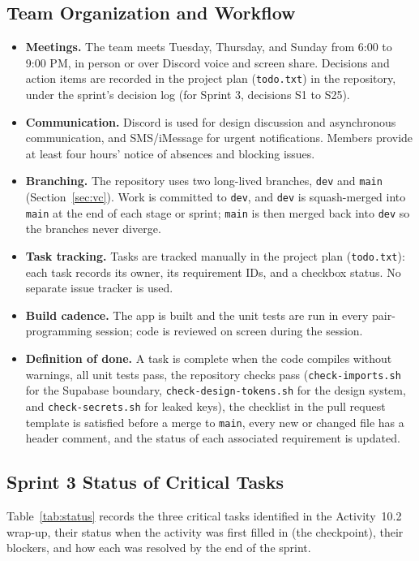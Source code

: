 \documentclass[12pt,letterpaper]{article}
\begin{document}
\subsection{Team Organization and Workflow}
\begin{itemize}
  \item \textbf{Meetings.} The team meets Tuesday, Thursday, and Sunday from 6:00 to
        9:00 PM, in person or over Discord voice and screen share. Decisions and
        action items are recorded in the project plan (\texttt{todo.txt}) in the
        repository, under the sprint's decision log (for Sprint 3, decisions S1 to
        S25).
  \item \textbf{Communication.} Discord is used for design discussion and asynchronous
        communication, and SMS/iMessage for urgent notifications. Members provide at
        least four hours' notice of absences and blocking issues.
  \item \textbf{Branching.} The repository uses two long-lived branches, \texttt{dev}
        and \texttt{main} (Section~\ref{sec:vc}). Work is committed to \texttt{dev},
        and \texttt{dev} is squash-merged into \texttt{main} at the end of each stage
        or sprint; \texttt{main} is then merged back into \texttt{dev} so the branches
        never diverge.
  \item \textbf{Task tracking.} Tasks are tracked manually in the project plan
        (\texttt{todo.txt}): each task records its owner, its requirement IDs, and a
        checkbox status. No separate issue tracker is used.
  \item \textbf{Build cadence.} The app is built and the unit tests are run in every
        pair-programming session; code is reviewed on screen during the session.
  \item \textbf{Definition of done.} A task is complete when the code compiles without
        warnings, all unit tests pass, the repository checks pass
        (\texttt{check-imports.sh} for the Supabase boundary,
        \texttt{check-design-tokens.sh} for the design system, and
        \texttt{check-secrets.sh} for leaked keys), the checklist in the pull request
        template is satisfied before a merge to \texttt{main}, every new or changed file has a header comment, and the status of
        each associated requirement is updated.
\end{itemize}

\subsection{Sprint 3 Status of Critical Tasks}
Table~\ref{tab:status} records the three critical tasks identified in the
Activity~10.2 wrap-up, their status when the activity was first filled in (the
checkpoint), their blockers, and how each was resolved by the end of the sprint.
\end{document}

